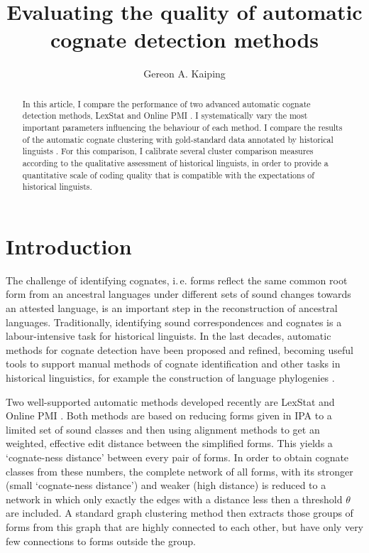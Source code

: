 \documentclass[a4paper,11pt,twocolumn]{scrartcl}
\begin{document}
\title{Evaluating the quality of automatic cognate detection methods}
\author[1]{Gereon A. Kaiping}

\maketitle
\begin{abstract}
In this article, I compare the performance of two advanced automatic cognate detection methods, LexStat \parencite{list2012lexstat} and Online PMI \parencite{rama2017fast}. I systematically vary the most important parameters influencing the behaviour of each method. I compare the results of the automatic cognate clustering with gold-standard data annotated by historical linguists \parencite{list-gold}. For this comparison, I calibrate several cluster comparison measures according to the qualitative assessment of historical linguists, in order to provide a quantitative scale of coding quality that is compatible with the expectations of historical linguists.
\end{abstract}
\section{Introduction}
The challenge of identifying cognates, i.\,e. forms reflect the same common root form from an ancestral languages under different sets of sound changes towards an attested language, is an important step in the reconstruction of ancestral languages. Traditionally, identifying sound correspondences and cognates is a labour-intensive task for historical linguists.
In the last decades, automatic methods for cognate detection have been proposed and refined, becoming useful tools to support manual methods of cognate identification and other tasks in historical linguistics, for example the construction of language phylogenies \parencite{rama2018are}.

Two well-supported automatic methods developed recently are LexStat \parencite{lexstat} and Online PMI \parencite{rama2017fast}. Both methods are based on reducing forms given in IPA to a limited set of sound classes and then using alignment methods to get an weighted, effective edit distance between the simplified forms. This yields a ‘cognate-ness distance’ between every pair of forms. In order to obtain cognate classes from these numbers, the complete network of all forms, with its stronger (small ‘cognate-ness distance’) and weaker (high distance) is reduced to a network in which only exactly the edges with a distance less then a threshold $θ$ are included. A standard graph clustering method then extracts those groups of forms from this graph that are highly connected to each other, but have only very few connections to forms outside the group.
\end{document}

